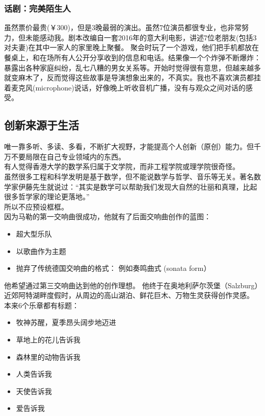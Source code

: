 \documentclass{article}        %
\providecommand{\tightlist}{%
  \setlength{\itemsep}{0pt}\setlength{\parskip}{0pt}}
\begin{document}
\hypertarget{ux8bddux5267ux5b8cux7f8eux964cux751fux4eba}{%
\subsubsection{话剧：完美陌生人}\label{ux8bddux5267ux5b8cux7f8eux964cux751fux4eba}}

虽然票价最贵(￥300)，但是3晚最弱的演出。虽然7位演员都很专业，也非常努力，但未能感动我。剧本改编自一套2016年的意大利电影，讲述7位老朋友(包括3对夫妻)在其中一家人的家里晚上聚餐。
聚会时玩了一个游戏，他们把手机都放在餐桌上，和在场所有人公开分享收到的信息和电话。结果像一个个炸弹不断爆炸：暴露出各种家庭纠纷，乱七八糟的男女关系等。开始时觉得很有意思，但越来越多就变麻木了，反而觉得这些故事是导演想象出来的，不真实。我也不喜欢演员都挂着麦克风(microphone)说话，好像晚上听收音机广播，没有与观众之间对话的感受。

\hypertarget{ux521bux65b0ux6765ux6e90ux4e8eux751fux6d3b}{%
\subsection{创新来源于生活}\label{ux521bux65b0ux6765ux6e90ux4e8eux751fux6d3b}}

唯一靠多听、多读、多看，不断扩大视野，才能提高个人创新（原创）能力。但千万不要局限在自己专业领域内的东西。\\
有人觉得香港大学的数学系归属于文学院，而非工程学院或理学院很奇怪。\\
虽然很多工程和科学发明是基于数学，但不能说数学与哲学、音乐等无关。著名数学家伊藤先生就说过：``其实是数学可以帮助我们发现大自然的壮丽和真理，比起很多哲学家的理论更落地。''\\
所以不应预设框框。\\
因为马勒的第一交响曲很成功，他就有了后面交响曲创作的蓝图：

\begin{itemize}
\tightlist
\item
  超大型乐队
\item
  以歌曲作为主题
\item
  抛弃了传统德国交响曲的格式： 例如奏鸣曲式 (sonata form）\\
\end{itemize}

他希望通过第三交响曲达到他的创作理想。
他终于在奥地利萨尔茨堡（Salzburg）近郊阿特湖畔度假时，从周边的高山湖泊、鲜花巨木、万物生灵获得创作灵感。\\
本来6个乐章都有标题：

\begin{itemize}
\tightlist
\item
  牧神苏醒，夏季昂头阔步地迈进
\item
  草地上的花儿告诉我
\item
  森林里的动物告诉我
\item
  人类告诉我
\item
  天使告诉我
\item
  爱告诉我\\
\end{itemize}
\end{document}
